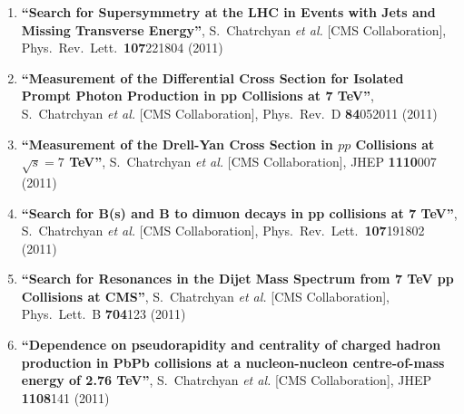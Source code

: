 \begin{enumerate}
\item%
{\bf ``Search for Supersymmetry at the LHC in Events with Jets and Missing Transverse Energy''}, 
  S.~Chatrchyan {\it et al.}  [CMS Collaboration], 
Phys.\ Rev.\ Lett.\  {\bf 107}221804 (2011) %


\item%
{\bf ``Measurement of the Differential Cross Section for Isolated Prompt Photon Production in pp Collisions at 7 TeV''}, 
  S.~Chatrchyan {\it et al.}  [CMS Collaboration], 
Phys.\ Rev.\ D {\bf 84}052011 (2011) %


\item%
{\bf ``Measurement of the Drell-Yan Cross Section in $pp$ Collisions at $\sqrt{s}=7$ TeV''}, 
  S.~Chatrchyan {\it et al.}  [CMS Collaboration], 
JHEP {\bf 1110}007 (2011) %


\item%
{\bf ``Search for B(s) and B to dimuon decays in pp collisions at 7 TeV''}, 
  S.~Chatrchyan {\it et al.}  [CMS Collaboration], 
Phys.\ Rev.\ Lett.\  {\bf 107}191802 (2011) %


\item%
{\bf ``Search for Resonances in the Dijet Mass Spectrum from 7 TeV pp Collisions at CMS''}, 
  S.~Chatrchyan {\it et al.}  [CMS Collaboration], 
Phys.\ Lett.\ B {\bf 704}123 (2011) %


\item%
{\bf ``Dependence on pseudorapidity and centrality of charged hadron production in PbPb collisions at a nucleon-nucleon centre-of-mass energy of 2.76 TeV''}, 
  S.~Chatrchyan {\it et al.}  [CMS Collaboration], 
JHEP {\bf 1108}141 (2011) %



\end{enumerate}
